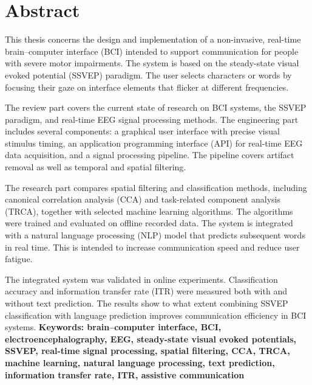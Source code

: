 
\chapter*{Abstract}

This thesis concerns the design and implementation of a non-invasive, real-time brain–computer interface (BCI) intended to support communication for people with severe motor impairments. The system is based on the steady-state visual evoked potential (SSVEP) paradigm. The user selects characters or words by focusing their gaze on interface elements that flicker at different frequencies.

The review part covers the current state of research on BCI systems, the SSVEP paradigm, and real-time EEG signal processing methods. The engineering part includes several components: a graphical user interface with precise visual stimulus timing, an application programming interface (API) for real-time EEG data acquisition, and a signal processing pipeline. The pipeline covers artifact removal as well as temporal and spatial filtering.

The research part compares spatial filtering and classification methods, including canonical correlation analysis (CCA) and task-related component analysis (TRCA), together with selected machine learning algorithms. The algorithms were trained and evaluated on offline recorded data. The system is integrated with a natural language processing (NLP) model that predicts subsequent words in real time. This is intended to increase communication speed and reduce user fatigue.

The integrated system was validated in online experiments. Classification accuracy and information transfer rate (ITR) were measured both with and without text prediction. The results show to what extent combining SSVEP classification with language prediction improves communication efficiency in BCI systems. 
\bigskip
\noindent\textbf{Keywords: brain–computer interface, BCI, electroencephalography, EEG, steady-state visual evoked potentials, SSVEP, real-time signal processing, spatial filtering, CCA, TRCA, machine learning, natural language processing, text prediction, information transfer rate, ITR, assistive communication }

